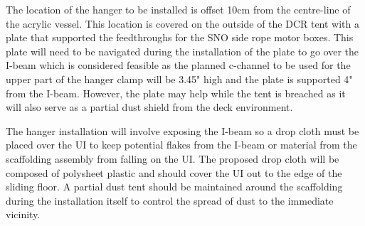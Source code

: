 \documentclass[11pt]{article}
\begin{document}
The location of the hanger to be installed is offset 10cm from the centre-line of the acrylic vessel. This location is covered on the outside of the DCR tent with a plate that supported the feedthroughs for the SNO side rope motor boxes. This plate will need to be navigated during the installation of the plate to go over the I-beam which is considered feasible as the planned c-channel to be used for the upper part of the hanger clamp will be 3.45" high and the plate is supported 4" from the I-beam. However, the plate may help while the tent is breached as it will also serve as a partial dust shield from the deck environment.

The hanger installation will involve exposing the I-beam so a drop cloth must be placed over the UI to keep potential flakes from the I-beam or material from the scaffolding assembly from falling on the UI. The proposed drop cloth will be composed of polysheet plastic and should cover the UI out to the edge of the sliding floor. A partial dust tent should be maintained around the scaffolding during the installation itself to control the spread of dust to the immediate vicinity. 
\end{document}
